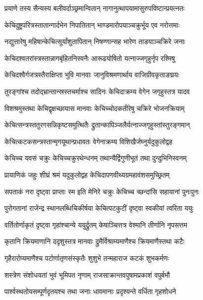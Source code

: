\twolineshloka
{प्रयाणे तस्य सैन्यस्य बलीवर्दाञ्छ्रमान्वितान्}
{नागानुत्थापयामासुरुपविष्टान्प्रयत्नतः}%

\twolineshloka
{केचिदुष्ट्रपरित्रस्तातान्गार्दभेन निपातितान्}
{भाण्डमारोपयाञ्चक्रुर्भूय एव नरोत्तमाः}%

\twolineshloka
{नद्युत्तारेषु महिषान्केचित्सूर्यांशुतापितान्}
{निषण्णान्सह भारेण ताडयाञ्चक्रिरे जनाः}%

\twolineshloka
{केचिदश्वतरांस्त्रस्तान्नागबृंहितनिस्वनैः}
{आरूढयोषितो यत्नाज्जगृहुर्नृप रश्मिषु}%

\twolineshloka
{केचिदश्वैर्गजत्रस्तैराक्षिप्ता भुवि मानवाः}
{जानुविश्रमणार्थाय वाजिग्रीवकृताङघ्रयः}%

\twolineshloka
{तुरङ्गांश्च तदोद्भ्रान्तान्स्रस्तचर्माश्च सादिनः}
{केचिदाक्रम्य वेगेन जगृहुस्तत्र यादव}%

\twolineshloka
{विशश्रमुस्तथा केचिद्वृक्षच्छायास मानवाः}
{केचिच्चोदकतीरेषु चक्रिरे भोजनक्रियाम्} %

\twolineshloka
{केचित्सन्त्रस्ततुरगसन्निकृष्टसमुत्थितैः}
{द्रुतान्कापिञ्जलैर्यत्नाज्जगृहुस्तांस्तुरङ्गमान्}%
 
\twolineshloka
{केचित्कटकसन्त्रस्तान्मृगयूथान्प्रधावतः}
{वेगेनाक्रम्य विशिखैर्जघ्नुर्यदुकुलोद्वह}%

\twolineshloka
{केचिच्च यवसं चक्रुः केचिच्चक्रुरथेन्धनम्}
{तथान्यैर्द्विगुणीभूतं तथा दुन्दुभिनिस्वनम्}%

\twolineshloka
{प्रायाणिकं जहुः शीघ्रं श्रमं यदुकुलोद्वह}
{केचिदापणवीथ्यग्रमहावंशसमुच्छ्रितम्}%

\twolineshloka
{सपताकं नरा दृष्ट्वा प्राप्ताः स्म इति मेनिरे}
{चक्रुः केचिच्च च्छन्दांसि सहायानां पुनःपुनः}%

\twolineshloka
{पुरोगतानां राजेन्द्र स्थानलब्धिचिकीर्षया}
{केचित्पटकुटीं दृष्ट्वा स्वकीयां त्वरिता ययुः}%

\twolineshloka
{वर्तितोर्णाकृतं दृष्ट्वा गृहांश्चान्ये ययुर्द्रुतम्}
{केषाञ्चित्तत्र वेश्मानि तीर्णानि नृपसत्तम}%

\twolineshloka
{कृतानि क्रियमाणानि ददृशुस्तत्र मानवाः}
{द्रुमैर्विश्राम्यमाणैश्च क्रियमाणैस्तथा कटैः}%

\twolineshloka
{गृहैरारोप्यमाणैश्च पटोर्णातृणसंस्कृतैः}
{शुशुभे तन्महाराज कटकं शुभकर्मणः}%

\twolineshloka
{शस्त्रेण संशोधयतां भुवं भूमिपत नृणाम्}
{राजसाक्रान्तवपुषामप्रकाशं वपुर्बभौ} %

\twolineshloka
{पार्श्वस्थतोयसम्पूर्णदृतयश्च तथा जनाः}
{धावमानाः प्रदृश्यन्ते वर्धिता गृहशोधने}%

